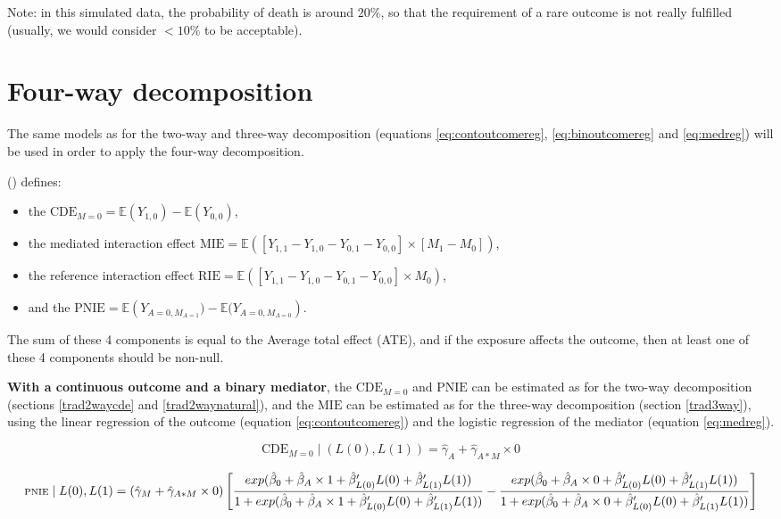 \documentclass[
]{book}
\providecommand{\tightlist}{%
  \setlength{\itemsep}{0pt}\setlength{\parskip}{0pt}}
\begin{document}
Note: in this simulated data, the probability of death is around \(20\%\), so that the requirement of a rare outcome is not really fulfilled (usually, we would consider \(< 10\%\) to be acceptable).

\section{Four-way decomposition}\label{four-way-decomposition}

The same models as for the two-way and three-way decomposition (equations \eqref{eq:contoutcomereg}, \eqref{eq:binoutcomereg} and \eqref{eq:medreg}) will be used in order to apply the four-way decomposition.

() defines:

\begin{itemize}
\tightlist
\item
  the \(\text{CDE}_{M=0} = \mathbb{E}\left( Y_{1,0}\right) - \mathbb{E}\left(Y_{0,0} \right)\),
\item
  the mediated interaction effect \(\text{MIE} = \mathbb{E}\left( \left[ Y_{1,1} - Y_{1,0} - Y_{0,1} - Y_{0,0}\right] \times \left[M_1 - M_0 \right]\right)\),
\item
  the reference interaction effect \(\text{RIE} = \mathbb{E}\left( \left[Y_{1,1} - Y_{1,0} - Y_{0,1} - Y_{0,0}\right] \times M_0 \right)\),
\item
  and the \(\text{PNIE} = \mathbb{E}\left(Y_{A=0,M_{A=1}}) - \mathbb{E}(Y_{A=0,M_{A=0}} \right)\).
\end{itemize}

The sum of these 4 components is equal to the Average total effect (ATE), and if the exposure affects the outcome, then at least one of these 4 components should be non-null.

\textbf{With a continuous outcome and a binary mediator}, the \(\text{CDE}_{M=0}\) and \(\text{PNIE}\) can be estimated as for the two-way decomposition (sections \ref{trad2waycde} and \ref{trad2waynatural}), and the \(\text{MIE}\) can be estimated as for the three-way decomposition (section \ref{trad3way}), using the linear regression of the outcome (equation \eqref{eq:contoutcomereg}) and the logistic regression of the mediator (equation \eqref{eq:medreg}).

\[\text{CDE}_{M=0} \mid \left(L(0),L(1) \right) = \hat{\gamma}_A + \hat{\gamma}_{A \ast M} \times 0\]

\[\scriptsize \text{PNIE} \mid L(0), L(1) = \left( \hat{\gamma}_M + \hat{\gamma}_{A \ast M} \times 0 \right) \left[ \frac{exp(\hat{\beta}_0 + \hat{\beta}_A \times 1 + \hat{\beta}_{L(0)}^\prime L(0) + \hat{\beta}_{L(1)}^\prime L(1))}{1 + exp(\hat{\beta}_0 + \hat{\beta}_A \times 1 + \hat{\beta}_{L(0)}^\prime L(0) + \hat{\beta}_{L(1)}^\prime L(1))} - \frac{exp(\hat{\beta}_0 + \hat{\beta}_A \times 0 + \hat{\beta}_{L(0)}^\prime L(0) + \hat{\beta}_{L(1)}^\prime L(1))}{1 + exp(\hat{\beta}_0 + \hat{\beta}_A \times 0 + \hat{\beta}_{L(0)}^\prime L(0) + \hat{\beta}_{L(1)}^\prime L(1))}\right]\]
\end{document}
